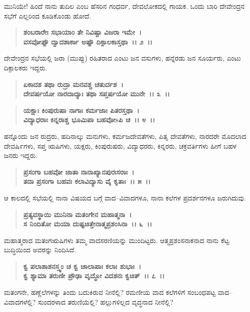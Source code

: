 ಮುನಿಯೇ! ಹಿಂದೆ ನಾನು ತುದಿಲ ಎಂಬ ಹೆಸರಿನ ಗಂಧರ್ವ, ದೇವಲೋಕದಲ್ಲಿ ಗಾಯಕ. ಒಂದು ಬಾರಿ ದೇವೇಂದ್ರನ ಸಭೆಗೆ ಎಲ್ಲರಿಂದ ಕೂಡಿಕೊಂಡು ಹೋದೆ.

\begin{verse}
\textbf{ಶಂಬರಾರೇಃ ಸಭಾಯಾಂ ತೇ ನಿವಿಷ್ಟಾ ವಿಜರಾ ಇಮೇ~।}\\\textbf{ವಸವೋಪ್ಟೌ ದ್ವಾದಶಾರ್ಕಾ ಅಷ್ಟೌ ದಿಕ್ಪಾಲಕಾಸ್ತಥಾ~।। ೨~।। }
\end{verse}

ದೇವೇಂದ್ರನ ಸಭೆಯಲ್ಲಿ ಜರಾ (ಮುಪ್ಪು) ರಹಿತರಾದ ಎಂಟು ಜನ ವಸುಗಳು, ಹನ್ನೆರಡು ಜನ ಸೂರ್ಯರು, ಎಂಟು ದಿಕ್ಪಾಲಕರು ಇದ್ದರು.

\begin{verse}
\textbf{ಏಕಾದಶ ತಥಾ ರುದ್ರಾ ಮನವಶ್ಚ ಚತುರ್ದಶ~।}\\\textbf{ದೇವರ್ಷಯೋ ನಾರದಾದ್ಯಾಃ ತಥಾ ಸಪ್ತರ್ಷಯೋ ಮುನೇ~।। ೩~।। }
\end{verse}

\begin{verse}
\textbf{ಯಕ್ಷಾಃ ಕಿಂಪುರುಷಾ ನಾಗಾಃ ಕರ್ಮಜಾಃ ಪಿತರಸ್ತಥಾ~।}\\\textbf{ವಿದ್ಯಾಧರಾಃ ಕಿನ್ನರಾಶ್ಚ ಭೂಮಿಪಾ ಬಹವೋsಪಿ ಚ~।। ೪~।। }
\end{verse}

ಹನ್ನೊಂದು ಜನ ರುದ್ರರು, ಹದಿನಾಲ್ಕು ಮನುಗಳು, ಕರ್ಮಜದೇವತೆಗಳು, ಪಿತೃ ದೇವತೆಗಳು, ನಾರದರೇ ಮೊದಲಾದ ದೇವಷಿ೯ಗಳು, ಸಪ್ತ ಋಷಿಗಳು, ಯಕ್ಷರು, ಕಿಂಪುರುಷರು, ವಿದ್ಯಾಧರರು, ಕಿನ್ನರರು, ಚಕ್ರವರ್ತಿಗಳು ಹೀಗೆ ಬಹಳ ಜನರು ಇದ್ದರು.

\begin{verse}
\textbf{ಪ್ರಸಂಗಾ ಬಹವೋ ಜಾತಾ ನಾನಾಖ್ಯಾನಪುರಃಸರಾಃ~।}\\\textbf{ತದಾ ಪ್ರಸಂಗಾ ಬಹವಃ ಕಲಾವಿದ್ಯಾಸು ವೈ ಕೃತಾಃ~।। ೫~।।} 
\end{verse}

ಆ ಕಾಲದಲ್ಲಿ ಸಭೆಯಲ್ಲಿ ನಾನಾ ವಿಷಯದ ಬಗ್ಗೆ ವಾದ–ವಿವಾದಗಳೂ, ನಾನಾ ಕಲೆಗಳ ಪ್ರದರ್ಶನಗಳೂ ಜರುಗಿದುವು.

\begin{verse}
\textbf{ಪ್ರತ್ಯವಸ್ಥಾಯಿ ಮುನಿನಾ ಮತಂಗೇನ ಮಹಾತ್ಮನಾ~।}\\\textbf{ಸ ನಿಂದಿತೋ ಮಯಾ ದುಷ್ಟಚಿತ್ತೇನಾತ್ಮಪ್ರಶಂಸಿನಾ~।। ೬~।। }
\end{verse}

ಮಹಾತ್ಮರಾದ ಮತಂಗಋಷಿಗಳು ತಮ್ಮ ವಾದಸರಣಿಯನ್ನು ಮುಂದಿಟ್ಟರು. ಆತ್ಮಪ್ರಶಂಸ\-ನಾಕನಾದ ನಾನು ಕೆಟ್ಟ ಬುದ್ಧಿಯಿಂದ ಅವರನ್ನು ನಿಂದಿಸಿದೆ.

\begin{verse}
\textbf{ಕ್ವ ಪಲಾಶಾಶನಸ್ತ್ವಂ ಚ ಕ್ವ ಚಾಲಾಪಾಃ ಕಲಾಃ ಶುಭಾಃ~।}\\\textbf{ಕ್ವ ಶ್ಯಾಮಾ ತರುಣೀ ಪ್ರೌಢಾ ವೃದ್ಧೋ ವಿದಶನಃ ಕ್ವಚಿತ್~।। ೭~।। }
\end{verse}

ಮತಂಗನೇ, ಹಣ್ಣೆಲೆಗಳನ್ನು ತಿಂದು ಬದುಕಿರುವ ನೀನೆಲ್ಲಿ? ರಮಣೀಯ ವಾದ ಕಲೆಗಳಿಗೆ ಸಂಬಂಧಪಟ್ಟ ವಾದ–ವಿವಾದಗಳೆಲ್ಲಿ? ಸುಂದರಳಾದ ತರುಣಿಯೆಲ್ಲಿ? ಹಲ್ಲುಗಳಿಲ್ಲದ ವೃದ್ಧನಾದ ನೀನೆಲ್ಲಿ?

